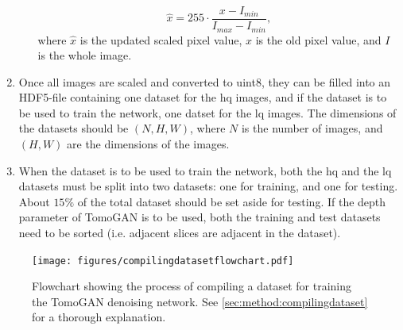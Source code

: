 \begin{enumerate}
\begin{enumerate}
        \begin{equation}
            \label{eq:scaleimages}
            \hat{x} = 255 \cdot \frac{x - I_{min}}{I_{max} - I_{min}},
        \end{equation}
        where $\hat{x}$ is the updated scaled pixel value, $x$ is the old pixel value, and $I$ is the whole image.
    \end{enumerate}
    \item Once all images are scaled and converted to uint8, they can be filled into an HDF5-file containing one dataset for the \gls{hq} images, and if the dataset is to be used to train the network, one datset for the \gls{lq} images. The dimensions of the datasets should be $(N,H,W)$, where $N$ is the number of images, and $(H,W)$ are the dimensions of the images. 
    \item When the dataset is to be used to train the network, both the \gls{hq} and the \gls{lq} datasets must be split into two datasets: one for training, and one for testing. About $15\%$ of the total dataset should be set aside for testing. If the depth parameter of TomoGAN is to be used, both the training and test datasets need to be sorted (i.e. adjacent slices are adjacent in the dataset). 
\end{enumerate}


\begin{figure}[htbp]  
    \centering
    \texttt{[image: figures/compilingdatasetflowchart.pdf]}
    \caption[Dataset creation flowchart]{Flowchart showing the process of compiling a dataset for training the TomoGAN denoising network. See \cref{sec:method:compilingdataset} for a thorough explanation. }
    \label{fig:compilingdatasetflowchart}
\end{figure}
